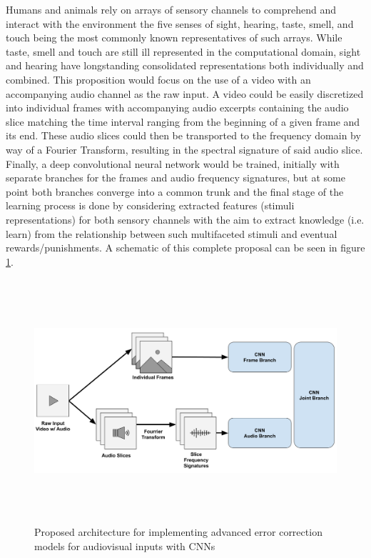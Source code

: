 \documentclass[10pt]{article}
\begin{document}
    Humans and animals rely on arrays of sensory channels to comprehend and interact with the environment the five senses of sight, hearing, taste, smell, and touch being the most commonly known representatives of such arrays. While taste, smell and touch are still ill represented in the computational domain, sight and hearing have longstanding consolidated representations both individually and combined. This proposition would focus on the use of a video with an accompanying audio channel as the raw input. A video could be easily discretized into individual frames with accompanying audio excerpts containing the audio slice matching the time interval ranging from the beginning of a given frame and its end. These audio slices could then be transported to the frequency domain by way of a Fourier Transform, resulting in the spectral signature of said audio slice. Finally, a deep convolutional neural network would be trained, initially with separate branches for the frames and audio frequency signatures, but at some point both branches converge into a common trunk and the final stage of the learning process is done by considering extracted features (stimuli representations) for both sensory channels with the aim to extract knowledge (i.e. learn) from the relationship between such multifaceted stimuli and eventual rewards/punishments. A schematic of this complete proposal can be seen in figure \ref{fig:proposal}.

    \begin{figure}[h]
        \centering
        \includegraphics[height=9cm]{Images/proposal/architecture.png}
        \caption{Proposed architecture for implementing advanced error correction models for audiovisual inputs with CNNs}
        \label{fig:proposal}
    \end{figure}
\end{document}
